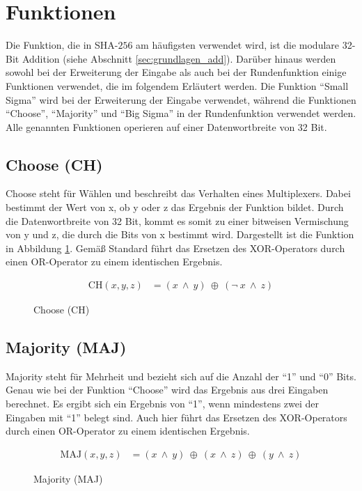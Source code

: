 \section{Funktionen}
\label{sec:sha256:funktionen}

Die Funktion, die in SHA-$256$ am häufigsten verwendet wird, ist die modulare 32-Bit Addition (siehe Abschnitt \ref{sec:grundlagen_add}).
Darüber hinaus werden sowohl bei der Erweiterung der Eingabe als auch bei der Rundenfunktion einige Funktionen verwendet, die im folgendem Erläutert werden.
Die Funktion "`Small Sigma"' wird bei der Erweiterung der Eingabe verwendet, während die Funktionen "`Choose"', "`Majority"' und "`Big Sigma"' in der Rundenfunktion
verwendet werden. Alle genannten Funktionen operieren auf einer Datenwortbreite von 32 Bit.


\subsection{Choose (CH)}
Choose steht für Wählen und beschreibt das Verhalten eines Multiplexers. Dabei bestimmt der Wert von x, ob y oder z das Ergebnis der Funktion bildet.
Durch die Datenwortbreite von 32 Bit, kommt es somit zu einer bitweisen Vermischung von y und z, die durch die Bits von x bestimmt wird. Dargestellt
ist die Funktion in Abbildung \ref{eq:ch}. Gemäß Standard \cite[10]{nist1804} führt das Ersetzen des XOR-Operators durch einen OR-Operator zu einem identischen Ergebnis.
\begin{figure}[!h]
  \begin{align}
  \text{CH}( x, y, z) &= (x~\wedge~y)~\oplus~( \neg~x~\wedge~z) \nonumber
  \end{align}
  \caption{Choose (CH)}
  \label{eq:ch}
\end{figure}

\subsection{Majority (MAJ)}
Majority steht für Mehrheit und bezieht sich auf die Anzahl der "`1"' und "`0"' Bits. Genau wie bei der Funktion "`Choose"' wird das Ergebnis aus drei Eingaben berechnet.
Es ergibt sich ein Ergebnis von "`1"', wenn mindestens zwei der Eingaben mit "`1"' belegt sind. Auch hier führt das Ersetzen des XOR-Operators durch einen OR-Operator zu
einem identischen Ergebnis.
\begin{figure}[!h]
  \begin{align}
  \text{MAJ}( x, y, z) &= (x~\wedge~y)~\oplus~(x~\wedge~z)~\oplus~(y~\wedge~z) \nonumber
  \end{align}
  \caption{Majority (MAJ)}
  \label{eq:maj}
\end{figure}

